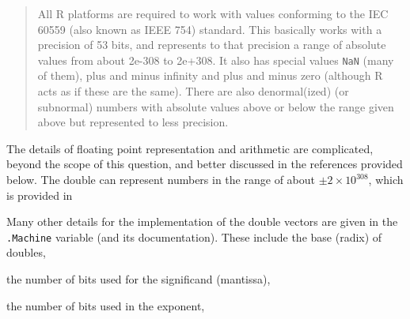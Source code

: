 \documentclass[]{book}
\newenvironment{Shaded}{\begin{snugshade}}{\end{snugshade}}
\newcommand{\CommentTok}[1]{\textcolor[rgb]{0.56,0.35,0.01}{\textit{#1}}}
\newcommand{\NormalTok}[1]{#1}
\newcommand{\OperatorTok}[1]{\textcolor[rgb]{0.81,0.36,0.00}{\textbf{#1}}}
\theoremstyle{plain}
\theoremstyle{remark}
\begin{document}
\begin{quote}
All R platforms are required to work with values conforming to the IEC
60559 (also known as IEEE 754) standard. This basically works with a
precision of 53 bits, and represents to that precision a range of
absolute values from about 2e-308 to 2e+308. It also has special values
\texttt{NaN} (many of them), plus and minus infinity and plus and minus
zero (although R acts as if these are the same). There are also
denormal(ized) (or subnormal) numbers with absolute values above or
below the range given above but represented to less precision.
\end{quote}

The details of floating point representation and arithmetic are
complicated, beyond the scope of this question, and better discussed in
the references provided below. The double can represent numbers in the
range of about \(\pm 2 \times 10^{308}\), which is provided in

\begin{Shaded}
\end{Shaded}

Many other details for the implementation of the double vectors are
given in the \texttt{.Machine} variable (and its documentation). These
include the base (radix) of doubles,

\begin{Shaded}
\end{Shaded}

the number of bits used for the significand (mantissa),

\begin{Shaded}
\end{Shaded}

the number of bits used in the exponent,

\begin{Shaded}
\end{Shaded}
\end{document}
